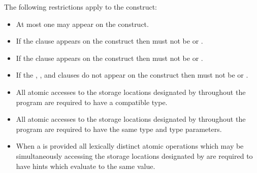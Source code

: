 \begin{samepage}


\restrictions

The following restrictions apply to the  construct:

\begin{itemize}
\item At most one  may appear on the construct.

\item If the  clause appears on the construct then
 must not be  or .

\item If the  clause appears on the construct then
 must not be  or .

\item If the , , and  clauses do not
appear on the construct then  must not be 
or .
\end{itemize}

\begin{ccppspecific}
\begin{itemize}
\item All atomic accesses to the storage locations designated by  throughout the program 
are required to have a compatible type. 
\end{itemize}
\end{ccppspecific}
\end{samepage}

\begin{fortranspecific}
\begin{itemize}
\item All atomic accesses to the storage locations designated by  throughout the program 
are required to have the same type and type parameters. 
\end{itemize}
\end{fortranspecific}

\begin{itemize}
\item When a  is provided all lexically distinct atomic operations which
may be simultaneously accessing the storage locations designated by
 are required to have hints which evaluate to the same value. 
\end{itemize}

